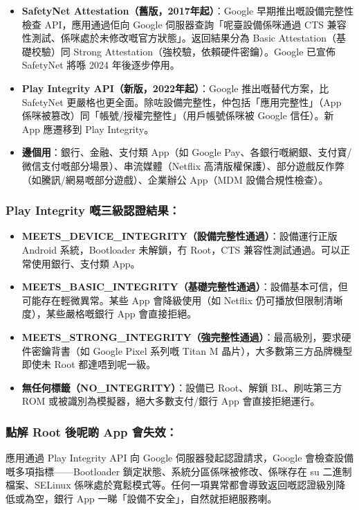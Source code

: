 \begin{itemize}
  \item \textbf{SafetyNet Attestation（舊版，2017年起）}：Google 早期推出嘅設備完整性檢查 API，應用通過佢向 Google 伺服器查詢「呢臺設備係咪通過 CTS 兼容性測試、係咪處於未修改嘅官方狀態」。返回結果分為 Basic Attestation（基礎校驗）同 Strong Attestation（強校驗，依賴硬件密鑰）。Google 已宣佈 SafetyNet 將喺 2024 年後逐步停用。
  \item \textbf{Play Integrity API（新版，2022年起）}：Google 推出嘅替代方案，比 SafetyNet 更嚴格也更全面。除咗設備完整性，仲包括「應用完整性」（App 係咪被篡改）同「帳號/授權完整性」（用戶帳號係咪被 Google 信任）。新 App 應遷移到 Play Integrity。
  \item \textbf{邊個用}：銀行、金融、支付類 App（如 Google Pay、各銀行嘅網銀、支付寶/微信支付嘅部分場景）、串流媒體（Netflix 高清版權保護）、部分遊戲反作弊（如騰訊/網易嘅部分遊戲）、企業辦公 App（MDM 設備合規性檢查）。
\end{itemize}

\subsubsection*{Play Integrity 嘅三級認證結果：}

\begin{itemize}
  \item \textbf{MEETS\_DEVICE\_INTEGRITY（設備完整性通過）}：設備運行正版 Android 系統，Bootloader 未解鎖，冇 Root，CTS 兼容性測試通過。可以正常使用銀行、支付類 App。
  \item \textbf{MEETS\_BASIC\_INTEGRITY（基礎完整性通過）}：設備基本可信，但可能存在輕微異常。某些 App 會降級使用（如 Netflix 仍可播放但限制清晰度），某些嚴格嘅銀行 App 會直接拒絕。
  \item \textbf{MEETS\_STRONG\_INTEGRITY（強完整性通過）}：最高級別，要求硬件密鑰背書（如 Google Pixel 系列嘅 Titan M 晶片），大多數第三方品牌機型即使未 Root 都達唔到呢一級。
  \item \textbf{無任何標籤（NO\_INTEGRITY）}：設備已 Root、解鎖 BL、刷咗第三方 ROM 或被識別為模擬器，絕大多數支付/銀行 App 會直接拒絕運行。
\end{itemize}

\subsubsection*{點解 Root 後呢啲 App 會失效：}

應用通過 Play Integrity API 向 Google 伺服器發起認證請求，Google 會檢查設備嘅多項指標——Bootloader 鎖定狀態、系統分區係咪被修改、係咪存在 su 二進制檔案、SELinux 係咪處於寬鬆模式等。任何一項異常都會導致返回嘅認證級別降低或為空，銀行 App 一睇「設備不安全」，自然就拒絕服務喇。

